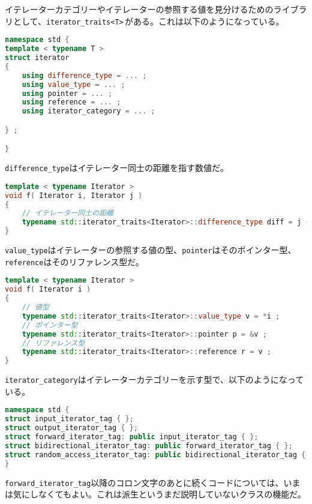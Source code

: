 イテレーターカテゴリーやイテレーターの参照する値を見分けるためのライブラリとして、\texttt{iterator\_traits<T>}\,がある。これは以下のようになっている。

\begin{lstlisting}[language={C++}]
namespace std {
template < typename T >
struct iterator
{
    using difference_type = ... ;
    using value_type = ... ;
    using pointer = ... ;
    using reference = ... ;
    using iterator_category = ... ;

} ;

}
\end{lstlisting}

\texttt{difference\_type}はイテレーター同士の距離を指す数値だ。

\begin{lstlisting}[language={C++}]
template < typename Iterator >
void f( Iterator i, Iterator j )
{
    // イテレーター同士の距離
    typename std::iterator_traits<Iterator>::difference_type diff = j - i ;
}
\end{lstlisting}

\texttt{value\_type}はイテレーターの参照する値の型、\texttt{pointer}はそのポインター型、\texttt{reference}はそのリファレンス型だ。

\begin{lstlisting}[language={C++}]
template < typename Iterator >
void f( Iterator i )
{
    // 値型
    typename std::iterator_traits<Iterator>::value_type v = *i ;
    // ポインター型 
    typename std::iterator_traits<Iterator>::pointer p = &v ;
    // リファレンス型
    typename std::iterator_traits<Iterator>::reference r = v ;
}
\end{lstlisting}

\ifTombow\pagebreak\fi
\texttt{iterator\_category}はイテレーターカテゴリーを示す型で、以下のようになっている。

\begin{lstlisting}[language={C++}]
namespace std {
struct input_iterator_tag { };
struct output_iterator_tag { };
struct forward_iterator_tag: public input_iterator_tag { };
struct bidirectional_iterator_tag: public forward_iterator_tag { };
struct random_access_iterator_tag: public bidirectional_iterator_tag { };
}
\end{lstlisting}

\texttt{forward\_iterator\_tag}以降のコロン文字のあとに続くコードについては、いまは気にしなくてもよい。これは派生というまだ説明していないクラスの機能だ。

